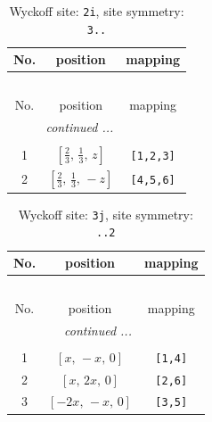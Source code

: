 \documentclass[fleqn,8pt]{jsarticle}
\begin{document}
\renewcommand{\arraystretch}{1.2}
\begin{longtable}{ccc}
\caption{Wyckoff site: {\tt 2i}, site symmetry: {\tt 3..}}
 \\
 \hline \hline
No. & position & mapping \\ \hline \endfirsthead

\multicolumn{2}{l}{\tablename\ \thetable{}} \\
 \hline \hline
No. & position & mapping \\ \hline \endhead

 \hline \hline
\multicolumn{2}{r}{\footnotesize\it continued ...} \\ \endfoot

 \hline \hline
\multicolumn{2}{r}{} \\ \endlastfoot

1 & $\left[ \frac{2}{3},\, \frac{1}{3},\, z \right]$ & {\tt [1,2,3]} \\ \hline
2 & $\left[ \frac{2}{3},\, \frac{1}{3},\, - z \right]$ & {\tt [4,5,6]} \\
\end{longtable}
\renewcommand{\arraystretch}{1.2}
\begin{longtable}{ccc}
\caption{Wyckoff site: {\tt 3j}, site symmetry: {\tt ..2}}
 \\
 \hline \hline
No. & position & mapping \\ \hline \endfirsthead

\multicolumn{2}{l}{\tablename\ \thetable{}} \\
 \hline \hline
No. & position & mapping \\ \hline \endhead

 \hline \hline
\multicolumn{2}{r}{\footnotesize\it continued ...} \\ \endfoot

 \hline \hline
\multicolumn{2}{r}{} \\ \endlastfoot

1 & $\left[ x,\, - x,\, 0 \right]$ & {\tt [1,4]} \\ \hline
2 & $\left[ x,\, 2 x,\, 0 \right]$ & {\tt [2,6]} \\ \hline
3 & $\left[ - 2 x,\, - x,\, 0 \right]$ & {\tt [3,5]} \\
\end{longtable}
\renewcommand{\arraystretch}{1.2}
\end{document}
